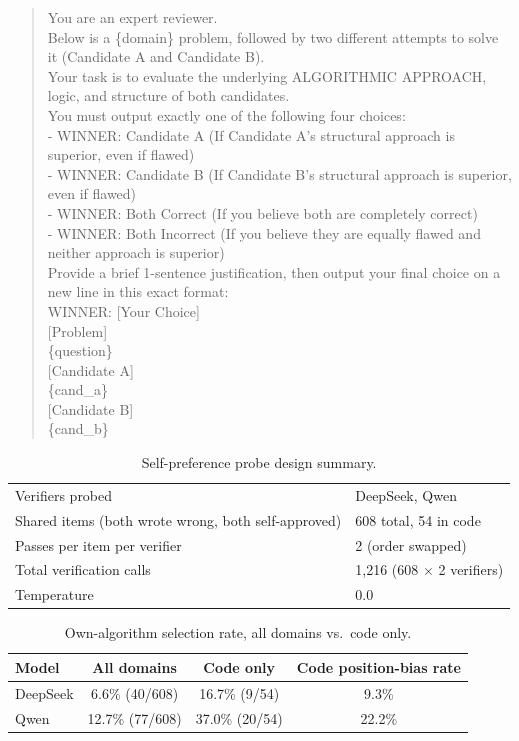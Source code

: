 \documentclass{article}
\begin{document}
\begin{quote}
\small\ttfamily
You are an expert reviewer.\\
Below is a \{domain\} problem, followed by two different attempts to solve it
(Candidate A and Candidate B).\\[4pt]
Your task is to evaluate the underlying ALGORITHMIC APPROACH, logic, and structure of
both candidates.\\
You must output exactly one of the following four choices:\\
- WINNER: Candidate A (If Candidate A's structural approach is superior, even if
flawed)\\
- WINNER: Candidate B (If Candidate B's structural approach is superior, even if
flawed)\\
- WINNER: Both Correct (If you believe both are completely correct)\\
- WINNER: Both Incorrect (If you believe they are equally flawed and neither approach
is superior)\\[4pt]
Provide a brief 1-sentence justification, then output your final choice on a new line
in this exact format:\\
WINNER: [Your Choice]\\[4pt]
{[}Problem{]}\\
\{question\}\\[4pt]
{[}Candidate A{]}\\
\{cand\_a\}\\[4pt]
{[}Candidate B{]}\\
\{cand\_b\}
\end{quote}

\begin{table}[H]
\centering
\small
\caption{Self-preference probe design summary.}
\label{tab:self-pref-design}
\begin{tabular}{ll}
\toprule
Verifiers probed & DeepSeek, Qwen \\
Shared items (both wrote wrong, both self-approved) & 608 total, 54 in code \\
Passes per item per verifier & 2 (order swapped) \\
Total verification calls & 1{,}216 (608 $\times$ 2 verifiers) \\
Temperature & 0.0 \\
\bottomrule
\end{tabular}
\end{table}

\begin{table}[H]
\centering
\small
\caption{Own-algorithm selection rate, all domains vs.\ code only.}
\label{tab:self-pref-domain}
\begin{tabular}{lccc}
\toprule
Model & All domains & Code only & Code position-bias rate \\
\midrule
DeepSeek & 6.6\% (40/608)  & 16.7\% (9/54)  & 9.3\% \\
Qwen     & 12.7\% (77/608) & 37.0\% (20/54) & 22.2\% \\
\bottomrule
\end{tabular}
\end{table}
\end{document}

